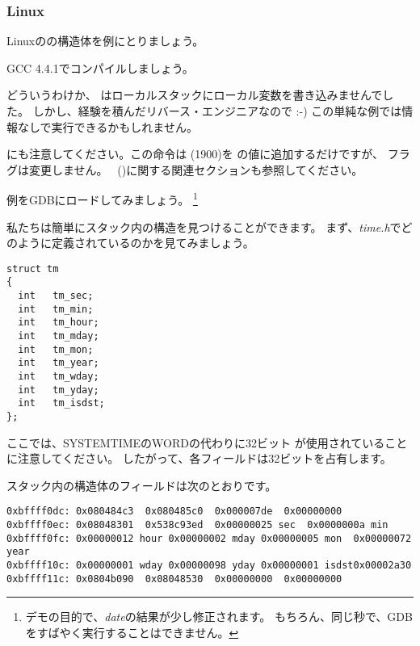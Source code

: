 ﻿\subsubsection{Linux}

Linuxのの構造体を例にとりましょう。



GCC 4.4.1でコンパイルしましょう。



どういうわけか、 \IDA はローカルスタックにローカル変数を書き込みませんでした。
しかし、経験を積んだリバース・エンジニアなので :-) この単純な例では情報なしで実行できるかもしれません。


にも注意してください。この命令は (1900)を \EAX の値に追加するだけですが、
フラグは変更しません。 \LEA{}~()に関する関連セクションも参照してください。


例をGDBにロードしてみましょう。
\footnote{デモの目的で、\emph{date}の結果が少し修正されます。 
もちろん、同じ秒で、GDBをすばやく実行することはできません。}



私たちは簡単にスタック内の構造を見つけることができます。
まず、\emph{time.h}でどのように定義されているのかを見てみましょう。

\begin{lstlisting}[caption=time.h, label=struct_tm,style=customc]
struct tm
{
  int	tm_sec;
  int	tm_min;
  int	tm_hour;
  int	tm_mday;
  int	tm_mon;
  int	tm_year;
  int	tm_wday;
  int	tm_yday;
  int	tm_isdst;
};
\end{lstlisting}

ここでは、SYSTEMTIMEのWORDの代わりに32ビット \Tint 
が使用されていることに注意してください。 
したがって、各フィールドは32ビットを占有します。

スタック内の構造体のフィールドは次のとおりです。

\begin{lstlisting}
0xbffff0dc:	0x080484c3	0x080485c0	0x000007de	0x00000000
0xbffff0ec:	0x08048301	0x538c93ed	0x00000025 sec	0x0000000a min
0xbffff0fc:	0x00000012 hour	0x00000002 mday	0x00000005 mon 	0x00000072 year
0xbffff10c:	0x00000001 wday	0x00000098 yday	0x00000001 isdst0x00002a30
0xbffff11c:	0x0804b090	0x08048530	0x00000000	0x00000000
\end{lstlisting}

